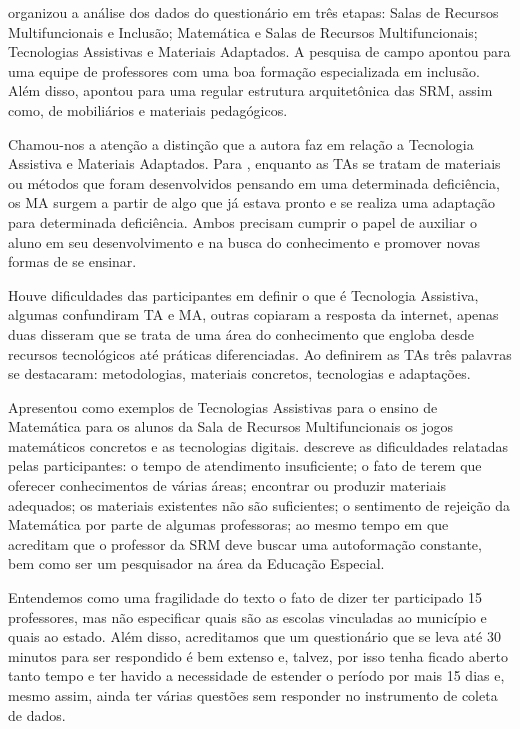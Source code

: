 \documentclass[portuguese]{textolivre}
\begin{document}
\textcite{gubert2022} organizou a análise dos dados do questionário em três
etapas: Salas de Recursos Multifuncionais e Inclusão; Matemática e Salas
de Recursos Multifuncionais; Tecnologias Assistivas e Materiais
Adaptados. A pesquisa de campo apontou para uma equipe de professores
com uma boa formação especializada em inclusão. Além disso, apontou para
uma regular estrutura arquitetônica das SRM, assim como, de mobiliários
e materiais pedagógicos.


Chamou-nos a atenção a distinção que
a autora faz em relação a Tecnologia Assistiva e Materiais Adaptados.
Para \textcite{gubert2022}, enquanto as TAs se tratam de materiais ou métodos
que foram desenvolvidos pensando em uma determinada deficiência, os MA
surgem a partir de algo que já estava pronto e se realiza uma adaptação
para determinada deficiência. Ambos precisam cumprir o papel de auxiliar
o aluno em seu desenvolvimento e na busca do conhecimento e promover
novas formas de se ensinar.

Houve dificuldades das participantes em definir o que é Tecnologia
Assistiva, algumas confundiram TA e MA, outras copiaram a resposta da
internet, apenas duas disseram que se trata de uma área do conhecimento
que engloba desde recursos tecnológicos até práticas diferenciadas. Ao
definirem as TAs três palavras se destacaram: metodologias, materiais
concretos, tecnologias e adaptações.

Apresentou como exemplos de Tecnologias Assistivas para o ensino de
Matemática para os alunos da Sala de Recursos Multifuncionais os jogos
matemáticos concretos e as tecnologias digitais. \textcite{gubert2022} descreve
as dificuldades relatadas pelas participantes: o tempo de atendimento
insuficiente; o fato de terem que oferecer conhecimentos de várias
áreas; encontrar ou produzir materiais adequados; os materiais
existentes não são suficientes; o sentimento de rejeição da Matemática
por parte de algumas professoras; ao mesmo tempo em que acreditam que o
professor da SRM deve buscar uma autoformação constante, bem como ser um
pesquisador na área da Educação Especial.

Entendemos como uma fragilidade do texto o fato de \textcite{gubert2022} dizer
ter participado 15 professores, mas não especificar quais são as escolas
vinculadas ao município e quais ao estado. Além disso, acreditamos que
um questionário que se leva até 30 minutos para ser respondido é bem
extenso e, talvez, por isso tenha ficado aberto tanto tempo e ter havido
a necessidade de estender o período por mais 15 dias e, mesmo assim,
ainda ter várias questões sem responder no instrumento de coleta de
dados.
\end{document}
